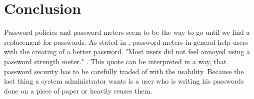 \documentclass[12pt,a4paper]{article}
\begin{document}

\section{Conclusion}
Password policies and password meters seem to be the way to go until we find a replacement for passwords.
As stated in  \cite{differentapproaches}, password meters in general help users with the creating of a better password. "Most users did not feel annoyed using a password strength meter." \cite{differentapproaches}. This quote can be interpreted in a way, that password security has to be carefully traded of with the usability. Because the last thing a system administrator wants is a user who is writing his passwords done on a piece of paper or heavily reuses them.

\printbibliography
\end{document}
